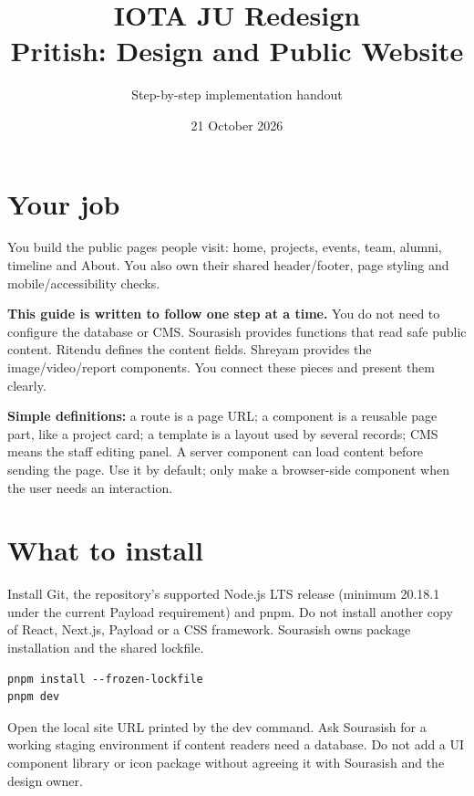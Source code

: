 \documentclass[11pt]{article}
\title{IOTA JU Redesign\\Pritish: Design and Public Website}
\author{Step-by-step implementation handout}
\date{21 October 2026}
\begin{document}
\maketitle

\section{Your job}
You build the public pages people visit: home, projects, events, team, alumni, timeline and About. You also own their shared header/footer, page styling and mobile/accessibility checks.

\textbf{This guide is written to follow one step at a time.} You do not need to configure the database or CMS. Sourasish provides functions that read safe public content. Ritendu defines the content fields. Shreyam provides the image/video/report components. You connect these pieces and present them clearly.

\textbf{Simple definitions:} a route is a page URL; a component is a reusable page part, like a project card; a template is a layout used by several records; CMS means the staff editing panel. A server component can load content before sending the page. Use it by default; only make a browser-side component when the user needs an interaction.

\section{What to install}
Install Git, the repository's supported Node.js LTS release (minimum 20.18.1 under the current Payload requirement) and pnpm. Do not install another copy of React, Next.js, Payload or a CSS framework. Sourasish owns package installation and the shared lockfile.
\begin{verbatim}
pnpm install --frozen-lockfile
pnpm dev
\end{verbatim}
Open the local site URL printed by the dev command. Ask Sourasish for a working staging environment if content readers need a database. Do not add a UI component library or icon package without agreeing it with Sourasish and the design owner.
\end{document}
